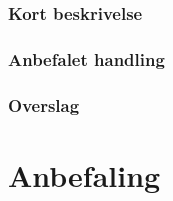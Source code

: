 \documentclass{article}
\begin{document}
\subsubsection{Kort beskrivelse}
\subsubsection{Anbefalet handling}
\subsubsection{Overslag}


\section{Anbefaling}

\end{document}
